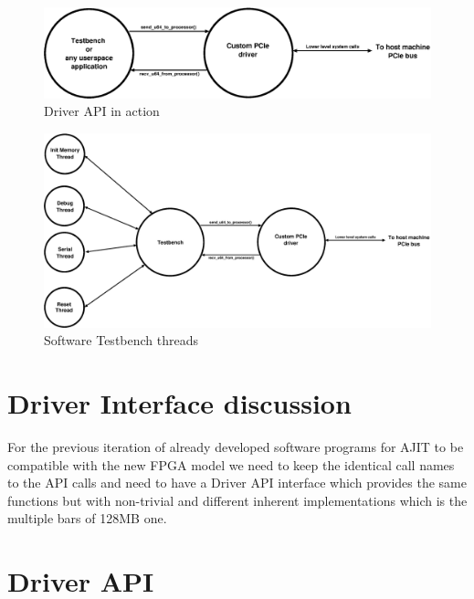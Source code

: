 \begin{figure}[H]
\centering
\includegraphics[width=\textwidth]{eps_pdf_sources/ajit_fpga/Software_Interface/testbench_and_application_illustration}
\caption{Driver API in action}
\end{figure}

\begin{figure}[H]
\centering
\includegraphics[width=\textwidth]{eps_pdf_sources/ajit_fpga/Software_Interface/testbench_illustration}
\caption{Software Testbench threads}
\end{figure}


\section{Driver Interface discussion}

For the previous iteration of already developed software programs for AJIT to be compatible with the new FPGA model we need to keep the
identical call names to the API calls and need to have a Driver API interface which provides the same functions but with non-trivial and
different inherent implementations which is the multiple bars of 128MB one.

\section{Driver API}

